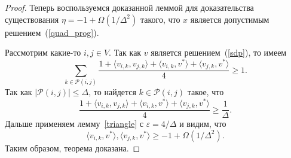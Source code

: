 \documentclass[12pt]{article}
\newcommand{\Pc}{\mathcal{P}}
\begin{document}
\begin{proof}
        Теперь воспользуемся доказанной леммой для доказательства существования $\eta = -1 + \Omega(1 / \Delta^2)$
        такого, что $x$ является допустимым решением~(\ref{quad_prog}).

        Рассмотрим какие-то $i, j \in V$.
        Так как $v$ является решением~(\ref{sdp}), то имеем
        $$
            \sum_{k \in \Pc(i, j)} \frac{1 + \langle v_{i,k}, v_{j, k} \rangle +
                                             \langle v_{i,k}, v^* \rangle +
                                             \langle v_{j,k}, v^* \rangle}{4} \geq 1.
        $$
        Так как $|\Pc(i, j)| \leq \Delta$, то найдется $k \in \Pc(i, j)$ такое, что
        $$
            \frac{1 + \langle v_{i,k}, v_{j, k} \rangle +
                                             \langle v_{i,k}, v^* \rangle +
                                             \langle v_{j,k}, v^* \rangle}{4} \geq \frac{1}{\Delta}.
        $$
        Дальше применяем лемму~\ref{triangle} с $\varepsilon = 4 / \Delta$ и видим, что
        $$
            \langle v_{i,k}, v^* \rangle, \langle v_{j,k}, v^* \rangle \geq -1 + \Omega(1 / \Delta^2).
        $$
        Таким образом, теорема доказана.
    \end{proof}
\end{document}
